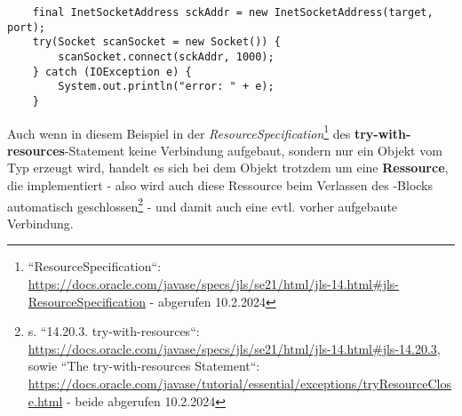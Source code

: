 \begin{verbatim}
    final InetSocketAddress sckAddr = new InetSocketAddress(target, port);
    try(Socket scanSocket = new Socket()) {
        scanSocket.connect(sckAddr, 1000);
    } catch (IOException e) {
        System.out.println("error: " + e);
    }
\end{verbatim}

\noindent
Auch wenn in diesem Beispiel in der \textit{ResourceSpecification}\footnote{
``ResourceSpecification``: \url{https://docs.oracle.com/javase/specs/jls/se21/html/jls-14.html#jls-ResourceSpecification} - abgerufen 10.2.2024
} des \textbf{try-with-resources}-Statement keine Verbindung aufgebaut, sondern nur ein Objekt vom Typ  erzeugt wird, handelt es sich bei dem Objekt trotzdem um eine \textbf{Ressource}, die  implementiert - also wird auch diese Ressource beim Verlassen des -Blocks automatisch geschlossen\footnote{
s. ``14.20.3. try-with-resources``: \url{https://docs.oracle.com/javase/specs/jls/se21/html/jls-14.html#jls-14.20.3}, sowie ``The try-with-resources Statement``: \url{https://docs.oracle.com/javase/tutorial/essential/exceptions/tryResourceClose.html} - beide abgerufen 10.2.2024
} - und damit auch eine {evtl.} vorher aufgebaute Verbindung.